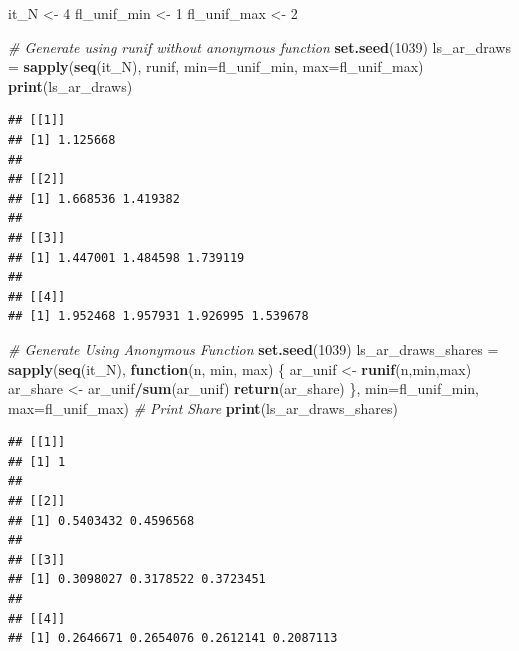 \documentclass[
]{book}
\newenvironment{Shaded}{\begin{snugshade}}{\end{snugshade}}
\newcommand{\CommentTok}[1]{\textcolor[rgb]{0.56,0.35,0.01}{\textit{#1}}}
\newcommand{\ControlFlowTok}[1]{\textcolor[rgb]{0.13,0.29,0.53}{\textbf{#1}}}
\newcommand{\DataTypeTok}[1]{\textcolor[rgb]{0.13,0.29,0.53}{#1}}
\newcommand{\DecValTok}[1]{\textcolor[rgb]{0.00,0.00,0.81}{#1}}
\newcommand{\KeywordTok}[1]{\textcolor[rgb]{0.13,0.29,0.53}{\textbf{#1}}}
\newcommand{\NormalTok}[1]{#1}
\newcommand{\OperatorTok}[1]{\textcolor[rgb]{0.81,0.36,0.00}{\textbf{#1}}}
\newcommand{\StringTok}[1]{\textcolor[rgb]{0.31,0.60,0.02}{#1}}
\begin{document}
\begin{Shaded}
\begin{Highlighting}[]
\NormalTok{it_N <-}\StringTok{ }\DecValTok{4}
\NormalTok{fl_unif_min <-}\StringTok{ }\DecValTok{1}
\NormalTok{fl_unif_max <-}\StringTok{ }\DecValTok{2}

\CommentTok{# Generate using runif without anonymous function}
\KeywordTok{set.seed}\NormalTok{(}\DecValTok{1039}\NormalTok{)}
\NormalTok{ls_ar_draws =}\StringTok{ }\KeywordTok{sapply}\NormalTok{(}\KeywordTok{seq}\NormalTok{(it_N),}
\NormalTok{                     runif,}
                     \DataTypeTok{min=}\NormalTok{fl_unif_min, }\DataTypeTok{max=}\NormalTok{fl_unif_max)}
\KeywordTok{print}\NormalTok{(ls_ar_draws)}
\end{Highlighting}
\end{Shaded}

\begin{verbatim}
## [[1]]
## [1] 1.125668
## 
## [[2]]
## [1] 1.668536 1.419382
## 
## [[3]]
## [1] 1.447001 1.484598 1.739119
## 
## [[4]]
## [1] 1.952468 1.957931 1.926995 1.539678
\end{verbatim}

\begin{Shaded}
\begin{Highlighting}[]
\CommentTok{# Generate Using Anonymous Function}
\KeywordTok{set.seed}\NormalTok{(}\DecValTok{1039}\NormalTok{)}
\NormalTok{ls_ar_draws_shares =}\StringTok{ }\KeywordTok{sapply}\NormalTok{(}\KeywordTok{seq}\NormalTok{(it_N),}
                            \ControlFlowTok{function}\NormalTok{(n, min, max) \{}
\NormalTok{                              ar_unif <-}\StringTok{ }\KeywordTok{runif}\NormalTok{(n,min,max)}
\NormalTok{                              ar_share <-}\StringTok{ }\NormalTok{ar_unif}\OperatorTok{/}\KeywordTok{sum}\NormalTok{(ar_unif)}
                              \KeywordTok{return}\NormalTok{(ar_share)}
\NormalTok{                            \},}
                            \DataTypeTok{min=}\NormalTok{fl_unif_min, }\DataTypeTok{max=}\NormalTok{fl_unif_max)}
\CommentTok{# Print Share}
\KeywordTok{print}\NormalTok{(ls_ar_draws_shares)}
\end{Highlighting}
\end{Shaded}

\begin{verbatim}
## [[1]]
## [1] 1
## 
## [[2]]
## [1] 0.5403432 0.4596568
## 
## [[3]]
## [1] 0.3098027 0.3178522 0.3723451
## 
## [[4]]
## [1] 0.2646671 0.2654076 0.2612141 0.2087113
\end{verbatim}
\end{document}
